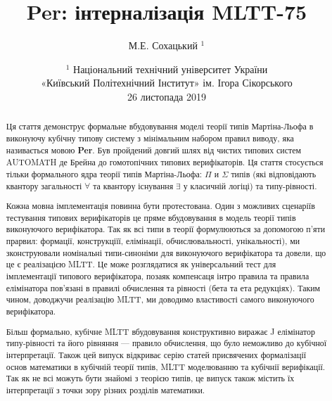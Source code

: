 \documentclass{article}
\begin{document}
\author { М.Е. Сохацький $^1$ }
\title { Per: інтерналізація MLTT-75 }
\date{ \small $^1$ Національний технічний університет України \\
       «Київський Політехнічний Інститут» ім. Ігора Сікорського \\
       26 листопада 2019 }
\maketitle

\begin{abstract}

Ця стаття демонструє формальне вбудовування моделі теорії типів Мартіна-Льофа
в виконуючу кубічну типову систему з мінімальним набором правил виводу, яка називається мовою {\bf Per}.
Був пройдений довгий шлях від чистих типових систем AUTOMATH де Брейна до
гомотопічних типових верифікаторів. Ця стаття стосується тільки формального ядра
теорії типів Мартіна-Льофа: $\Pi$ и $\Sigma$ типів (які відповідають
квантору загальності $\forall$ та квантору існування $\exists$ у класичній логіці)
та типу-рівності.

Кожна мовна імплементація повинна бути протестована. Один з можливих сценаріїв
тестування типових верифікаторів це пряме вбудовування в модель теорії типів
виконуючого верифікатора. Так як всі типи в теорії формулюються за допомогою п'яти
прарвил: формації, конструкціїї, елімінації, обчислювальності, унікальності), ми зконструювали
номінальні типи-синоніми для виконуючого верифікатора та довели, що це є реалізацією MLTT.
Це може розглядатися як універсальний тест для імплементації типового верифікатора,
позаяк компенсаця інтро правила та правила елімінатора пов'язані в правилі
обчислення та рівності (бета та ета редукціях). Таким чином, доводжучи реалізацію MLTT,
ми доводимо властивості самого виконуючого верифікатора.

Більш формально, кубічне MLTT вбудовування конструктивно виражає
J елімінатор типу-рівності та його рівняння — правило обчислення,
що було неможливо до кубічної інтерпретації. Також цей випуск
відкриває серію статей присвячених формалізації основ математики в кубічній теорії типів,
MLTT моделюванню та кубічнії верифікації. Так як не всі можуть бути знайомі з теорією типів,
це випуск також містить їх інтерпретації з точки зору різних розділів математики.

\end{abstract}
\end{document}
